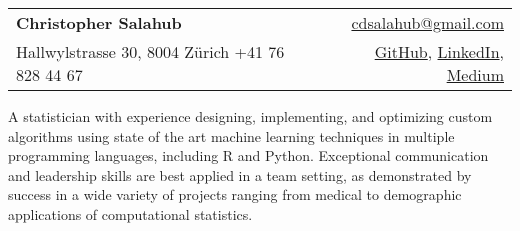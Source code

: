 \documentclass[letterpaper,11pt]{article}
\begin{document}
\begin{tabular*}{\textwidth}{l@{\extracolsep{\fill}}r}
	\textbf{\LARGE{Christopher Salahub}} & \href{mailto:cdsalahub@gmail.com}{cdsalahub@gmail.com} \\
	{Hallwylstrasse 30, 8004 Z\"urich \hspace{0.25cm} +41 76 828 44 67} & \href{https://github.com/Salahub}{GitHub}, \href{https://www.linkedin.com/in/christopher-salahub-9ba79396/}{LinkedIn}, \href{https://medium.com/@cdsalahub}{Medium} \\
\end{tabular*}
\vspace{0.1cm}

A statistician with experience designing, implementing, and optimizing custom algorithms using state of the art machine learning techniques in multiple programming languages, including R and Python. Exceptional communication and leadership skills are best applied in a team setting, as demonstrated by success in a wide variety of projects ranging from medical to demographic applications of computational statistics.
\end{document}
